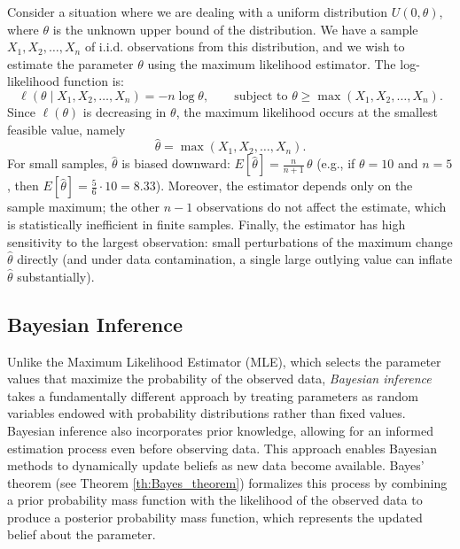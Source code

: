 \begin{example}
Consider a situation where we are dealing with a uniform distribution \( U(0, \theta) \), where \( \theta \) is the unknown upper bound of the distribution. We have a sample \( X_1, X_2, \dots, X_n \) of i.i.d. observations from this distribution, and we wish to estimate the parameter \( \theta \) using the maximum likelihood estimator. The log-likelihood function is:
\[
\ell(\theta \mid X_1, X_2, \dots, X_n) = -n \log \theta, \qquad \text{subject to } \theta \geq \max(X_1, X_2, \dots, X_n).
\]
Since \( \ell(\theta) \) is decreasing in \( \theta \), the maximum likelihood occurs at the smallest feasible value, namely
\[
\hat{\theta} = \max(X_1, X_2, \dots, X_n).
\]
For small samples, \( \hat{\theta} \) is biased downward: \( E[\hat{\theta}] = \frac{n}{n+1}\,\theta \) (e.g., if \( \theta = 10 \) and \( n=5 \), then \( E[\hat{\theta}]=\frac{5}{6}\cdot 10 = 8.33 \)). Moreover, the estimator depends only on the sample maximum; the other \(n-1\) observations do not affect the estimate, which is statistically inefficient in finite samples. Finally, the estimator has high sensitivity to the largest observation: small perturbations of the maximum change \(\hat{\theta}\) directly (and under data contamination, a single large outlying value can inflate \(\hat{\theta}\) substantially).
\end{example}


\subsection{Bayesian Inference}
\label{sec:bayesian_inference}

Unlike the Maximum Likelihood Estimator (MLE), which selects the parameter values that maximize the probability of the observed data, \emph{Bayesian inference} takes a fundamentally different approach by treating parameters as random variables endowed with probability distributions rather than fixed values. Bayesian inference also incorporates prior knowledge, allowing for an informed estimation process even before observing data. This approach enables Bayesian methods to dynamically update beliefs as new data become available. Bayes' theorem (see Theorem \ref{th:Bayes_theorem}) formalizes this process by combining a prior probability mass function with the likelihood of the observed data to produce a posterior probability mass function, which represents the updated belief about the parameter.


